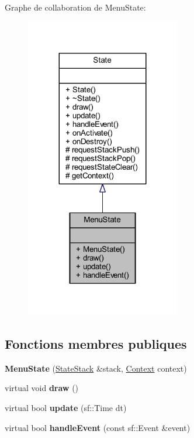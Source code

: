 Graphe de collaboration de Menu\+State\+:\nopagebreak
\begin{figure}[H]
\begin{center}
\leavevmode
\includegraphics[width=191pt]{class_menu_state__coll__graph}
\end{center}
\end{figure}
\subsection*{Fonctions membres publiques}
\begin{DoxyCompactItemize}
\item 
\hypertarget{class_menu_state_a6e7034c57bf83f24aa8f4321d3d210a5}{}\label{class_menu_state_a6e7034c57bf83f24aa8f4321d3d210a5} 
{\bfseries Menu\+State} (\hyperlink{class_state_stack}{State\+Stack} \&stack, \hyperlink{struct_state_1_1_context}{Context} context)
\item 
\hypertarget{class_menu_state_aa557d6c3bf06bb3107ed780913a6b47f}{}\label{class_menu_state_aa557d6c3bf06bb3107ed780913a6b47f} 
virtual void {\bfseries draw} ()
\item 
\hypertarget{class_menu_state_adac67748651bd33ddadb36a4f8a246da}{}\label{class_menu_state_adac67748651bd33ddadb36a4f8a246da} 
virtual bool {\bfseries update} (sf\+::\+Time dt)
\item 
\hypertarget{class_menu_state_a04a21241cebf6a8f0fe8ee9ce895ef18}{}\label{class_menu_state_a04a21241cebf6a8f0fe8ee9ce895ef18} 
virtual bool {\bfseries handle\+Event} (const sf\+::\+Event \&event)
\end{DoxyCompactItemize}
